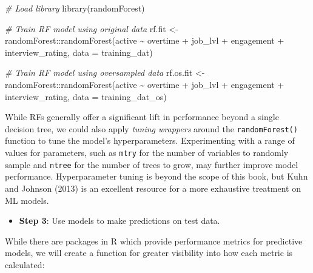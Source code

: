 \documentclass[
]{book}
\newenvironment{Shaded}{\begin{snugshade}}{\end{snugshade}}
\newcommand{\AttributeTok}[1]{\textcolor[rgb]{0.77,0.63,0.00}{#1}}
\newcommand{\CommentTok}[1]{\textcolor[rgb]{0.56,0.35,0.01}{\textit{#1}}}
\newcommand{\FunctionTok}[1]{\textcolor[rgb]{0.00,0.00,0.00}{#1}}
\newcommand{\NormalTok}[1]{#1}
\newcommand{\OtherTok}[1]{\textcolor[rgb]{0.56,0.35,0.01}{#1}}
\newcommand{\SpecialCharTok}[1]{\textcolor[rgb]{0.00,0.00,0.00}{#1}}
\providecommand{\tightlist}{%
  \setlength{\itemsep}{0pt}\setlength{\parskip}{0pt}}
\begin{document}
\begin{Shaded}
\begin{Highlighting}[]
\CommentTok{\# Load library}
\FunctionTok{library}\NormalTok{(randomForest)}

\CommentTok{\# Train RF model using original data}
\NormalTok{rf.fit }\OtherTok{\textless{}{-}}\NormalTok{ randomForest}\SpecialCharTok{::}\FunctionTok{randomForest}\NormalTok{(active }\SpecialCharTok{\textasciitilde{}}\NormalTok{ overtime }\SpecialCharTok{+}\NormalTok{ job\_lvl }\SpecialCharTok{+}\NormalTok{ engagement }\SpecialCharTok{+}\NormalTok{ interview\_rating, }\AttributeTok{data =}\NormalTok{ training\_dat)}

\CommentTok{\# Train RF model using oversampled data}
\NormalTok{rf.os.fit }\OtherTok{\textless{}{-}}\NormalTok{ randomForest}\SpecialCharTok{::}\FunctionTok{randomForest}\NormalTok{(active }\SpecialCharTok{\textasciitilde{}}\NormalTok{ overtime }\SpecialCharTok{+}\NormalTok{ job\_lvl }\SpecialCharTok{+}\NormalTok{ engagement }\SpecialCharTok{+}\NormalTok{ interview\_rating, }\AttributeTok{data =}\NormalTok{ training\_dat\_os)}
\end{Highlighting}
\end{Shaded}

While RFs generally offer a significant lift in performance beyond a single decision tree, we could also apply \emph{tuning wrappers} around the \texttt{randomForest()} function to tune the model's hyperparameters. Experimenting with a range of values for parameters, such as \texttt{mtry} for the number of variables to randomly sample and \texttt{ntree} for the number of trees to grow, may further improve model performance. Hyperparameter tuning is beyond the scope of this book, but Kuhn and Johnson (2013) is an excellent resource for a more exhaustive treatment on ML models.

\begin{itemize}
\tightlist
\item
  \textbf{Step 3}: Use models to make predictions on test data.
\end{itemize}

While there are packages in R which provide performance metrics for predictive models, we will create a function for greater visibility into how each metric is calculated:
\end{document}
